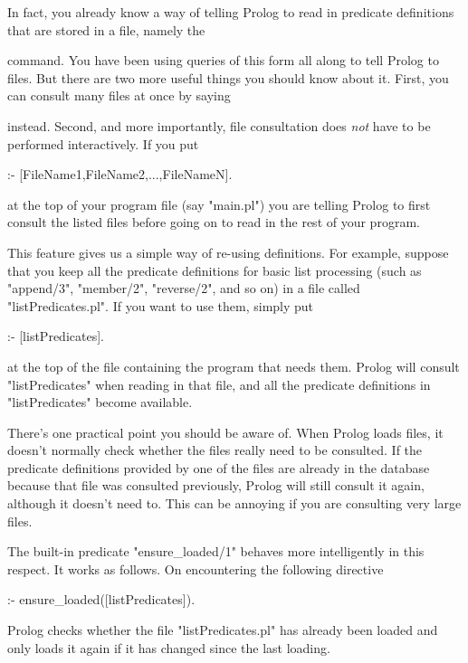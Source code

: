 In fact, you already know a way of telling Prolog to read in predicate
definitions that are stored in a file, namely the
\begin{LPNcodedisplay}
[FileName1]
\end{LPNcodedisplay}
command. You have been using queries of this form all along to tell
Prolog to  files. But there are two more useful things
you should know about it.  First, you can consult many files at once
by saying
\begin{LPNcodedisplay}
\end{LPNcodedisplay}
instead. Second, and more importantly,
file consultation does \textit{not} have
to be performed interactively. If you put
\begin{LPNcodedisplay}
:- [FileName1,FileName2,...,FileNameN].
\end{LPNcodedisplay}
at the top of your program file (say "main.pl") you are telling Prolog
to first consult the listed files before going on to read in the rest
of your program.


This feature gives us a simple way of re-using definitions.  For
example, suppose that you keep all the predicate definitions for basic
list processing (such as "append/3", "member/2", "reverse/2", and so
on) in a file called "listPredicates.pl". If you want to use them,
simply put
\begin{LPNcodedisplay}
:- [listPredicates].
\end{LPNcodedisplay}
at the top of the file  containing the program that needs
them. Prolog will consult "listPredicates" when reading in that file,
and all the predicate definitions in "listPredicates" become
available.

There's one practical point you should be aware of. When Prolog loads
files, it doesn't normally check whether the files really need to be
consulted. If the predicate definitions provided by one of the files
are already in the database because that file was consulted
previously, Prolog will still consult it again, although it doesn't
need to. This can be annoying if you are consulting very large
files.

The built-in predicate
"ensure\_loaded/1" behaves more intelligently  in this respect.  It
works as follows. On encountering the following
directive
\begin{LPNcodedisplay}
:- ensure_loaded([listPredicates]).
\end{LPNcodedisplay}
Prolog checks whether the file "listPredicates.pl" has already been
loaded and only loads it again if it has changed since the last
loading.




